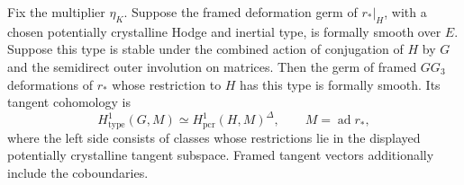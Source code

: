 \begin{lemma}
\label{AC-G65-descent}
Fix the multiplier \(\eta_K\).  Suppose the framed deformation
germ of \(r_*|_H\), with a chosen potentially crystalline Hodge
and inertial type, is formally smooth over \(E\).
Suppose this type is stable under the combined action of
conjugation of \(H\) by \(G\) and the semidirect outer involution
on matrices.  Then the germ of framed \(GG_3\) deformations of
\(r_*\) whose restriction to \(H\) has this type is formally
smooth.  Its tangent cohomology is
\[
 H^1_{\mathrm{type}}(G,M)
   \simeq H^1_{\mathrm{pcr}}(H,M)^\Delta,
 \qquad M=\operatorname{ad}r_*,
 \tag{RC.3}
\]
where the left side consists of classes whose restrictions
lie in the displayed potentially crystalline tangent subspace.
Framed tangent vectors additionally include the coboundaries.
\end{lemma}
